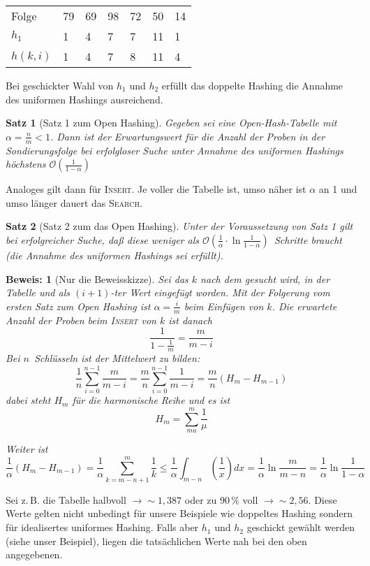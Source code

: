 \documentclass[ngerman,draft,parskip=half*,twoside]{scrreprt}
\theoremstyle{break}
\newtheorem{satz}{Satz}[chapter]
\theoremstyle{nonumberbreak}
\newtheorem{beweis}{Beweis:}
\newcommand*{\OO}{\mathcal{O}}      %
\begin{document}
\begin{tabular}{lllllll}
Folge & 79 & 69 & 98 & 72 & 50 & 14\\
$h_1$ & 1 & 4 & 7 & 7 & 11 & 1\\
$h(k,i)$ & 1 & 4 & 7 & 8 & 11 & 4\\
\end{tabular}

Bei geschickter Wahl von $h_1$ und $h_2$ erfüllt das doppelte Hashing die Annahme des uniformen Hashings ausreichend.
 
\begin{satz}[Satz 1 zum Open Hashing]
Gegeben sei eine Open-Hash-Tabelle mit $\alpha=\frac{n}{m}<1$. Dann ist der Erwartungswert für die Anzahl der Proben in
der Sondierungsfolge bei erfolgloser Suche unter Annahme des uniformen Hashings höchstens
$\OO(\frac{1}{1-\alpha})$
\end{satz}
Analoges gilt dann für \textsc{Insert}. Je voller die Tabelle ist, umso näher ist $\alpha$ an 1 und umso länger
dauert das \textsc{Search}.

\begin{satz}[Satz 2 zum das Open Hashing]
Unter der Voraussetzung von Satz 1 gilt bei erfolgreicher Suche, daß
diese weniger als $\OO(\frac{1}{\alpha} \cdot\ln\frac{1}{1-\alpha})$~Schritte braucht (die Annahme des uniformen Hashings sei erfüllt).
\end{satz}

\begin{beweis}[Nur die Beweisskizze]
Sei das $k$ nach dem gesucht wird, in der Tabelle und als $(i+1)$-ter Wert eingefügt worden. Mit der Folgerung vom
ersten Satz zum Open Hashing ist $\alpha=\frac{i}{m}$ beim Einfügen von $k$. Die erwartete Anzahl der Proben beim
\textsc{Insert} von $k$ ist danach \[\frac{1}{1-\frac{1}{m}}=\frac{m}{m-i}\]
Bei $n$~Schlüsseln ist der Mittelwert zu bilden: 
\[\frac{1}{n} \sum_{i=0}^{n-1} \frac{m}{m-i}=\frac{m}{n} \sum_{i=0}^{n-1}
\frac{1}{m-i}=\frac{m}{n}(H_m-H_{m-1})\] dabei steht $H_m$ für die harmonische Reihe und es ist
\[H_m=\sum_{mu}^{m}\frac{1}{\mu}\]

Weiter ist
\[\frac{1}{\alpha}(H_m-H_{m-1})=\frac{1}{\alpha} \sum_{k=m-n+1}^m \frac{1}{k} \leq \frac{1}{\alpha}\int_{m-n}
(\frac{1}{x})dx=\frac{1}{\alpha} \ln{\frac{m}{m-n}}=\frac{1}{\alpha}\ln{\frac{1}{1-\alpha}}\]
\end{beweis}

Sei z.\,B. die Tabelle halbvoll $\rightarrow \sim 1,387$ oder zu 90\,\% voll $\rightarrow \sim 2,56$. Diese Werte gelten
nicht unbedingt für unsere Beispiele wie doppeltes Hashing sondern für idealisertes uniformes Hashing. Falls aber
$h_1$ und $h_2$ geschickt gewählt werden (siehe unser Beispiel), liegen die tatsächlichen Werte nah bei den oben
angegebenen. 
\end{document}
